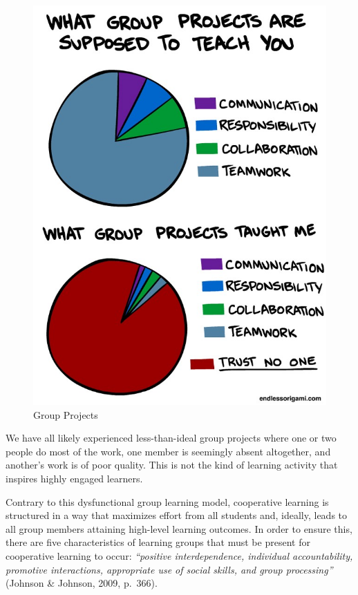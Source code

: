 \documentclass[
]{book}
\begin{document}
\begin{figure}
\centering
\includegraphics{assets/u3/U5_T2_Image.jpg}
\caption{Group Projects}
\end{figure}

We have all likely experienced less-than-ideal group projects where one or two people do most of the work, one member is seemingly absent altogether, and another's work is of poor quality. This is not the kind of learning activity that inspires highly engaged learners.

Contrary to this dysfunctional group learning model, cooperative learning is structured in a way that maximizes effort from all students and, ideally, leads to all group members attaining high-level learning outcomes. In order to ensure this, there are five characteristics of learning groups that must be present for cooperative learning to occur: \emph{``positive interdependence, individual accountability, promotive interactions, appropriate use of social skills, and group processing''} (Johnson \& Johnson, 2009, p.~366).
\end{document}
